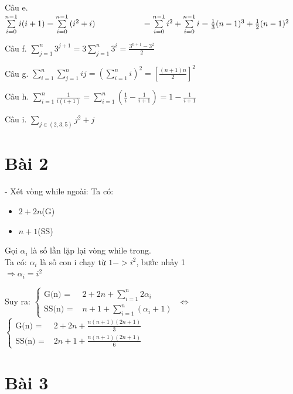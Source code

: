 \documentclass{article}
\newcommand\tab[1][1cm]{\hspace*{#1}}
\begin{document}
\vspace{5mm}
Câu e. 
\tab \(\sum\limits_{i=0}^{n-1}{i(i+1)} = \sum\limits_{i=0}^{n-1}{(i^2 + i)}\\
\tab \tab = \sum\limits_{i=0}^{n-1}{i^2} + \sum\limits_{i=0}^{n-1}{i} = \frac{1}{3}(n-1)^3 + \frac{1}{2}(n-1)^2
\)

\vspace{5mm}
Câu f. 
\tab \(\sum\limits_{j=1}^{n}{3^{j+1}} = 3\sum\limits_{j=1}^{n}3^{i} = \frac{3^{n+1} - 3^2}{2}\)

\vspace{5mm}
Câu g. 
\tab \(\sum\limits_{i=1}^{n}\sum\limits_{j=1}^{n}{ij} = (\sum\limits_{i=1}^{n}{i})^2 = [\frac{(n+1)n}{2}]^2\)

\vspace{5mm}
Câu h. 
\tab \(\sum\limits_{i=1}^{n}{\frac{1}{i(i+1)}} = \sum\limits_{i=1}^{n}{(\frac{1}{i} - \frac{1}{i+1} )} = 1 - \frac{1}{i+1} \)

\vspace{5mm}
Câu i. 
\tab \(\sum\limits_{j\in (2,3,5)}^{ }{j^2 + j} \)

\section*{Bài 2}

- Xét vòng while ngoài:
Ta có:
\begin{itemize}
    \item $ 2+2n $(G)
    \item $ n + 1 $(SS)
\end{itemize}

Gọi $\alpha_{i}$ là số lần lặp lại vòng while trong.\\
Ta có: $\alpha_{i}$ là số con i chạy từ $ 1 -> i^2$, bước nhảy 1 \\
\(\Rightarrow \alpha_{i} = i^2 \)


\tab Suy ra:
\(
\begin{cases}
    \text{G(n) = } & 2 +2n +  \sum\limits_{i=1}^{n}2\alpha_{i} \\
    \text{SS(n) = } &  n + 1 + \sum\limits_{i=1}^{n}(\alpha_{i}+1)
\end{cases}
\)
\tab $\Leftrightarrow $
\(
\begin{cases}
    \text{G(n) = } & 2 +2n +  \frac{n(n+1)(2n+1)}{3} \\
    \text{SS(n) = } &  2n + 1 + \frac{n(n+1)(2n+1)}{6}
\end{cases}
\)

\section*{Bài 3}
\end{document}
